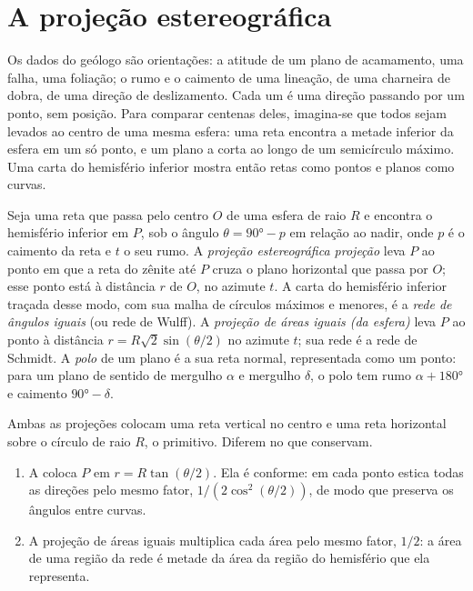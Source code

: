 \section{A projeção estereográfica}\label{sec:b3:structural-analysis:stereo}

Os dados do geólogo são orientações: a atitude de um plano de acamamento,
uma falha, uma foliação; o rumo e o caimento de uma lineação, de uma charneira de dobra, de uma
direção de deslizamento. Cada um é uma direção passando por um ponto, sem posição. Para
comparar centenas deles, imagina-se que todos sejam levados ao centro de uma mesma esfera:
uma reta encontra a metade inferior da esfera em um só ponto, e um plano a corta ao longo de
um semicírculo máximo. Uma carta do hemisfério inferior mostra então retas como
pontos e planos como curvas.

\begin{definition}\label{def:b3:structural-analysis:stereo}
Seja uma reta que passa pelo centro $O$ de uma esfera de raio $R$ e encontra o
hemisfério inferior em $P$, sob o ângulo $\theta = \ang{90} - p$ em relação ao nadir, onde
$p$ é o caimento da reta e $t$ o seu rumo. A \emph{projeção estereográfica
projeção} leva $P$ ao ponto em que a
reta do zênite até $P$ cruza o plano horizontal que passa por
$O$; esse ponto está à distância $r$ de $O$, no azimute $t$. A
carta do hemisfério inferior traçada desse modo, com sua malha de círculos máximos e
menores, é a \emph{rede de ângulos iguais} (ou
rede de Wulff). A \emph{projeção de áreas iguais (da esfera)}
leva $P$ ao ponto à distância $r =
R\sqrt2\sin(\theta/2)$ no azimute $t$; sua rede é a rede de Schmidt. A
\emph{polo} de um plano é a sua reta normal, representada como
um ponto: para um plano de sentido de mergulho $\alpha$ e mergulho $\delta$, o polo
tem rumo $\alpha + \ang{180}$ e caimento $\ang{90} - \delta$.
\end{definition}

Ambas as projeções colocam uma reta vertical no centro e uma reta horizontal sobre
o círculo de raio $R$, o primitivo. Diferem no que conservam.

\begin{theorem}\label{thm:b3:structural-analysis:projections}
\begin{enumerate}[label=(\alph*)]
  \item A  coloca $P$ em $r = R\tan(\theta/2)$. Ela
        é conforme: em cada ponto estica todas as direções pelo mesmo
        fator, $1/(2\cos^2(\theta/2))$, de modo que preserva os ângulos entre
        curvas.
  \item A projeção de áreas iguais multiplica cada área pelo mesmo fator,
        $1/2$: a área de uma região da rede é metade da área da região
        do hemisfério que ela representa.
\end{enumerate}
\end{theorem}

